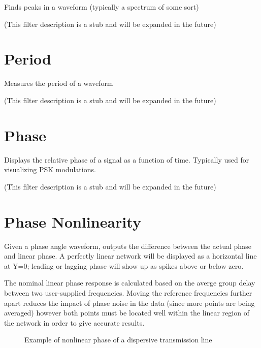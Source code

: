 Finds peaks in a waveform (typically a spectrum of some sort)

(This filter description is a stub and will be expanded in the future)

\pagebreak
\section{Period}

Measures the period of a waveform

(This filter description is a stub and will be expanded in the future)

\pagebreak
\section{Phase}

Displays the relative phase of a signal as a function of time. Typically used for visualizing PSK modulations.

(This filter description is a stub and will be expanded in the future)

\pagebreak
\section{Phase Nonlinearity}

Given a phase angle waveform, outputs the difference between the actual phase and linear phase. A perfectly linear
network will be displayed as a horizontal line at Y=0; leading or lagging phase will show up as spikes above or below
zero.

The nominal linear phase response is calculated based on the averge group delay between two user-supplied frequencies.
Moving the reference frequencies further apart reduces the impact of phase noise in the data (since more points are
being averaged) however both points must be located well within the linear region of the network in order to give
accurate results.

\begin{figure}[h]
\centering
{}
\caption{Example of nonlinear phase of a dispersive transmission line}
\label{phase_nonlinearity_example}
\end{figure}

